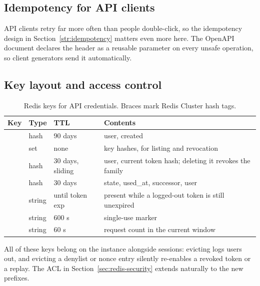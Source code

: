 \subsection*{Idempotency for API clients}
API clients retry far more often than people double-click, so the idempotency design in Section~\ref{str:idempotency} matters even more here. The OpenAPI document declares the  header as a reusable parameter on every unsafe operation, so client generators send it automatically.

\subsection*{Key layout and access control}
\begin{table}[!htbp]\centering\small
\caption{Redis keys for API credentials. Braces mark Redis Cluster hash tags.}\label{tab:apikeys}
\begin{tabular}{L{.29\linewidth}L{.13\linewidth}L{.17\linewidth}L{.28\linewidth}}\toprule
Key & Type & TTL & Contents \\ \midrule
{} & hash & 90 days & user, created \\
 & set & none & key hashes, for listing and revocation \\
 & hash & 30 days, sliding & user, current token hash; deleting it revokes the family \\
 & hash & 30 days & state, used\_at, successor, user \\
 & string & until token exp & present while a logged-out token is still unexpired \\
 & string & 600 s & single-use marker \\
 & string & 60 s & request count in the current window \\
\bottomrule\end{tabular}
\end{table}
All of these keys belong on the  instance alongside sessions: evicting  logs users out, and evicting a denylist or nonce entry silently re-enables a revoked token or a replay. The ACL in Section~\ref{sec:redis-security} extends naturally to the new prefixes.

